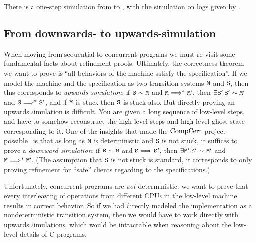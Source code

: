 \begin{theorem}
There is a one-step simulation from  to
, with the simulation on logs given by .
\end{theorem}


\subsection{From downwards- to upwards-simulation}
\label{chapter:mcslock:sec:downwards-to-upwards}

When moving from sequential to concurrent programs we must
re-visit some fundamental facts about refinement proofs.  Ultimately,
the correctness theorem we want to prove is ``all behaviors of the
machine satisfy the specification''. If we model the machine and the
specification as two transition systems ${\mathrm{\texttt{M}}}$ and ${\mathrm{\texttt{S}}}$, then this
corresponds to \emph{upwards simulation}: if ${\mathrm{\texttt{S}}} \sim {\mathrm{\texttt{M}}}$ and 
${\mathrm{\texttt{M}}} \Longrightarrow^* {\mathrm{\texttt{M}}}'$, then $\exists {\mathrm{\texttt{S}}}'. {\mathrm{\texttt{S}}}' \sim {\mathrm{\texttt{M}}}'$ and
 ${\mathrm{\texttt{S}}} \Longrightarrow^* {\mathrm{\texttt{S}}}'$, and if ${\mathrm{\texttt{M}}}$ is stuck then ${\mathrm{\texttt{S}}}$ is stuck also.
But directly proving an upwards simulation is difficult. You are given
a long sequence of low-level steps, and have to somehow reconstruct
the high-level steps and high-level ghost state corresponding to
it. One of the insights that made the $\mathrm{CompCert}$ project
possible~\cite{Leroy-backend} is that as long as ${\mathrm{\texttt{M}}}$ is deterministic
and ${\mathrm{\texttt{S}}}$ is not stuck, it suffices to prove a \emph{downward
  simulation}: if ${\mathrm{\texttt{S}}} \sim {\mathrm{\texttt{M}}}$ and ${\mathrm{\texttt{S}}} \Longrightarrow {\mathrm{\texttt{S}}}'$, then $\exists
{\mathrm{\texttt{M}}}'. {\mathrm{\texttt{S}}}' \sim {\mathrm{\texttt{M}}}'$ and ${\mathrm{\texttt{M}}} \Longrightarrow^* {\mathrm{\texttt{M}}}'$. (The assumption that ${\mathrm{\texttt{S}}}$
is not stuck is standard, it corresponds to only proving refinement
for ``safe'' clients regarding to the specifications.)

Unfortunately, concurrent programs are \emph{not} deterministic: we
want to prove that every interleaving of operations from
different CPUs in the low-level machine results in correct
behavior. So if we had directly modeled the implementation as a
nondeterministic transition system, then we would have to work
directly with upwards simulations, which would be intractable when
reasoning about the low-level details of C programs.

